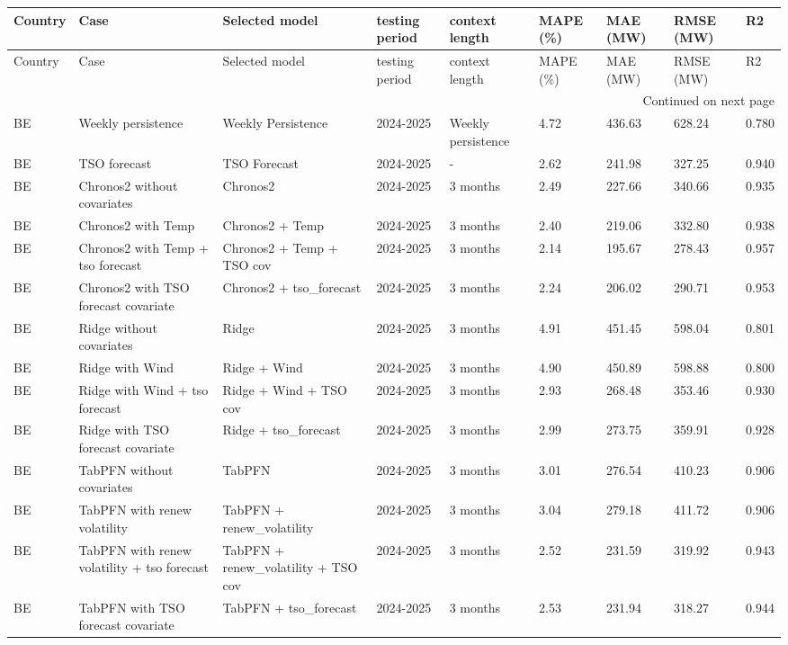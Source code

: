 \begin{longtable}{lllllllll}
\toprule
Country & Case & Selected model & testing period & context length & MAPE (\%) & MAE (MW) & RMSE (MW) & R2 \\
\midrule
\endfirsthead
\toprule
Country & Case & Selected model & testing period & context length & MAPE (\%) & MAE (MW) & RMSE (MW) & R2 \\
\midrule
\endhead
\midrule
\multicolumn{9}{r}{Continued on next page} \\
\midrule
\endfoot
\bottomrule
\endlastfoot
BE & Weekly persistence & Weekly Persistence & 2024-2025 & Weekly persistence & 4.72 & 436.63 & 628.24 & 0.780 \\
BE & TSO forecast & TSO Forecast & 2024-2025 & - & 2.62 & 241.98 & 327.25 & 0.940 \\
BE & Chronos2 without covariates & Chronos2 & 2024-2025 & 3 months & 2.49 & 227.66 & 340.66 & 0.935 \\
BE & Chronos2 with Temp & Chronos2 + Temp & 2024-2025 & 3 months & 2.40 & 219.06 & 332.80 & 0.938 \\
BE & Chronos2 with Temp + tso forecast & Chronos2 + Temp + TSO cov & 2024-2025 & 3 months & 2.14 & 195.67 & 278.43 & 0.957 \\
BE & Chronos2 with TSO forecast covariate & Chronos2 + tso\_forecast & 2024-2025 & 3 months & 2.24 & 206.02 & 290.71 & 0.953 \\
BE & Ridge without covariates & Ridge & 2024-2025 & 3 months & 4.91 & 451.45 & 598.04 & 0.801 \\
BE & Ridge with Wind & Ridge + Wind & 2024-2025 & 3 months & 4.90 & 450.89 & 598.88 & 0.800 \\
BE & Ridge with Wind + tso forecast & Ridge + Wind + TSO cov & 2024-2025 & 3 months & 2.93 & 268.48 & 353.46 & 0.930 \\
BE & Ridge with TSO forecast covariate & Ridge + tso\_forecast & 2024-2025 & 3 months & 2.99 & 273.75 & 359.91 & 0.928 \\
BE & TabPFN without covariates & TabPFN & 2024-2025 & 3 months & 3.01 & 276.54 & 410.23 & 0.906 \\
BE & TabPFN with renew volatility & TabPFN + renew\_volatility & 2024-2025 & 3 months & 3.04 & 279.18 & 411.72 & 0.906 \\
BE & TabPFN with renew volatility + tso forecast & TabPFN + renew\_volatility + TSO cov & 2024-2025 & 3 months & 2.52 & 231.59 & 319.92 & 0.943 \\
BE & TabPFN with TSO forecast covariate & TabPFN + tso\_forecast & 2024-2025 & 3 months & 2.53 & 231.94 & 318.27 & 0.944 \\
\end{longtable}
